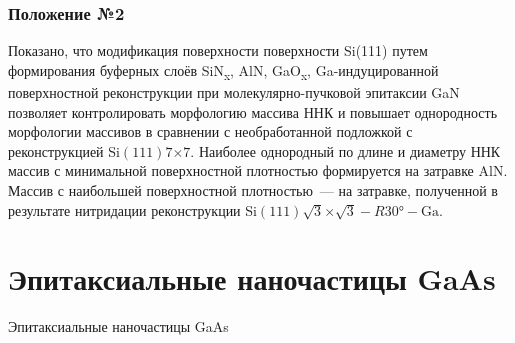 \begin{frame}
	\frametitle{Положение №2}
	\large
Показано, что модификация поверхности поверхности Si(111) путем формирования буферных слоёв SiN\textsubscript{x}, AlN, GaO\textsubscript{x}, Ga-индуцированной поверхностной реконструкции при молекулярно-пучковой эпитаксии GaN позволяет контролировать морфологию массива ННК и повышает однородность морфологии массивов в сравнении с необработанной подложкой с реконструкцией Si\((111)7\)\(\times\)\(7\). Наиболее однородный по
длине и диаметру ННК массив с минимальной поверхностной плотностью
формируется на затравке AlN. Массив с наибольшей поверхностной плотностью~--- на затравке, полученной в результате нитридации реконструкции
Si\((111)\sqrt{3}\)\(\times\)\(\sqrt{3} - R30\si{\degree} - \text{Ga}\).
\end{frame}

\section{Эпитаксиальные наночастицы GaAs}

\begin{frame}
	\begin{center}
		\Huge
		Эпитаксиальные наночастицы GaAs
	\end{center}
\end{frame}

